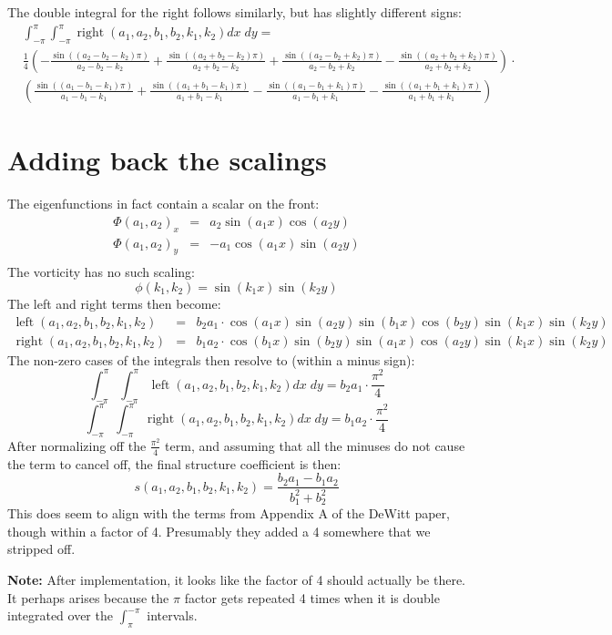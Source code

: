 \documentclass[12pt,onecolumn]{article}
\DeclareMathOperator{\Left}{left}
\DeclareMathOperator{\Right}{right}
\begin{document}
The double integral for the right follows similarly, but has slightly different signs:
\begin{equation}
\begin{split}
&\int_{-\pi}^\pi\int_{-\pi}^\pi \Right(a_1, a_2, b_1, b_2, k_1, k_2) dx \; dy = \\
&\frac{1}{4}\left( 
-\frac{\sin\left((a_2 - b_2 - k_2)\pi\right)}{a_2 - b_2 - k_2}
+ \frac{\sin\left((a_2 + b_2 - k_2)\pi\right)}{a_2 + b_2 - k_2}
+ \frac{\sin\left((a_2 - b_2 + k_2)\pi\right)}{a_2 - b_2 + k_2}
- \frac{\sin\left((a_2 + b_2 + k_2)\pi\right)}{a_2 + b_2 + k_2}
\right) \cdot\\
&\left( 
 \frac{\sin\left((a_1 - b_1 - k_1)\pi\right)}{a_1 - b_1 - k_1}
+ \frac{\sin\left((a_1 + b_1 - k_1)\pi\right)}{a_1 + b_1 - k_1}
- \frac{\sin\left((a_1 - b_1 + k_1)\pi\right)}{a_1 - b_1 + k_1}
- \frac{\sin\left((a_1 + b_1 + k_1)\pi\right)}{a_1 + b_1 + k_1}
\right)
\end{split}
\end{equation}

\section{Adding back the scalings}

The eigenfunctions in fact contain a scalar on the front:
\begin{eqnarray*}
\Phi(a_1, a_2)_x &=& a_2 \sin(a_1 x) \cos(a_2 y)\\
\Phi(a_1, a_2)_y &=& -a_1 \cos(a_1 x) \sin(a_2 y)\\
\end{eqnarray*}
The vorticity has no such scaling:
\begin{equation*}
\phi(k_1, k_2) = \sin(k_1 x) \sin(k_2 y)
\end{equation*}
The left and right terms then become:
\begin{eqnarray*}
\Left(a_1, a_2, b_1, b_2, k_1, k_2) &=& b_2 a_1\cdot \cos(a_1 x) \sin(a_2 y) \sin(b_1 x) \cos(b_2 y) \sin(k_1 x) \sin(k_2 y)\\
\Right(a_1, a_2, b_1, b_2, k_1, k_2) &=& b_1 a_2 \cdot \cos(b_1 x) \sin(b_2 y) \sin(a_1 x) \cos(a_2 y) \sin(k_1 x) \sin(k_2 y)
\end{eqnarray*}
The non-zero cases of the integrals then resolve to (within a minus sign):
\begin{equation*}
\int_{-\pi}^\pi\int_{-\pi}^\pi \Left(a_1, a_2, b_1, b_2, k_1, k_2) dx \; dy = b_2 a_1 \cdot \frac{\pi^2}{4}
\end{equation*}
\begin{equation*}
\int_{-\pi}^\pi\int_{-\pi}^\pi \Right(a_1, a_2, b_1, b_2, k_1, k_2) dx \; dy = b_1 a_2 \cdot \frac{\pi^2}{4}
\end{equation*}
After normalizing off the $\frac{\pi^2}{4}$ term, and assuming that all the minuses do not cause the term to cancel off, the final structure coefficient is then:
\begin{equation*}
s(a_1, a_2, b_1, b_2, k_1, k_2) = \frac{b_2 a_1 - b_1 a_2}{b_1^2 + b_2^2}
\end{equation*}
This does seem to align with the terms from Appendix A of the DeWitt paper, though within a factor of 4. Presumably they added a 4 somewhere that we stripped off.

{\bf Note:} After implementation, it looks like the factor of 4 should actually be there. It perhaps arises because the $\pi$ factor gets repeated 4 times when it is double integrated over the $\int_\pi^{-\pi}$ intervals.
\end{document}
